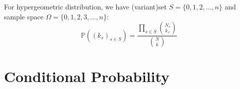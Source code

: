 \documentclass{article}
\newcommand{\Prob}{\mathbb{P}}
\begin{document}
\begin{definition}
	For hypergeometric distribution, we have (variant)set $S=\{0,1,2,...,n\}$ and sample space $\Omega=\{0,1,2,3,...,n\}$:
	\begin{equation*}
		\Prob((k_s)_{s\in S})=\frac{\prod_{s\in S}{N_s\choose k_s}}{{N\choose k}}
	\end{equation*}
\end{definition}





\section{Conditional Probability}







\newpage





\end{document}
